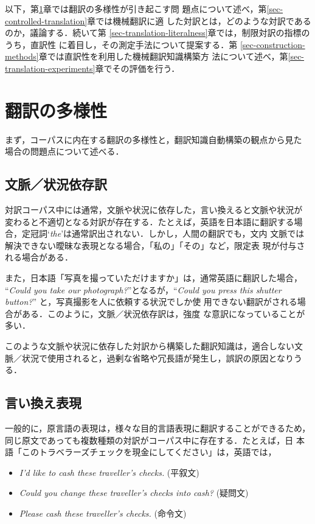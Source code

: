 以下，第\ref{sec-translation-variety}章では翻訳の多様性が引き起こす問
題点について述べ，第\ref{sec-controlled-translation}章では機械翻訳に適
した対訳とは，どのような対訳であるのか，議論する．続いて第
\ref{sec-translation-literalness}章では，制限対訳の指標のうち，直訳性
に着目し，その測定手法について提案する．第
\ref{sec-construction-methods}章では直訳性を利用した機械翻訳知識構築方
法について述べ，第\ref{sec-translation-experiments}章でその評価を行う．

\section{翻訳の多様性}
\label{sec-translation-variety}

まず，コーパスに内在する翻訳の多様性と，翻訳知識自動構築の観点から見た
場合の問題点について述べる．

\subsection{文脈／状況依存訳}

対訳コーパス中には通常，文脈や状況に依存した，言い換えると文脈や状況が
変わると不適切となる対訳が存在する．たとえば，英語を日本語に翻訳する場
合，定冠詞`{\it the}'は通常訳出されない．しかし，人間の翻訳でも，文内
文脈では解決できない曖昧な表現となる場合，「私の」「その」など，限定表
現が付与される場合がある．

また，日本語「写真を撮っていただけますか」は，通常英語に翻訳した場合，
``{\it Could you take our photograph?}''となるが，``{\it Could you
press this shutter button?}''  と，写真撮影を人に依頼する状況でしか使
用できない翻訳がされる場合がある．このように，文脈／状況依存訳は，強度
な意訳になっていることが多い．

このような文脈や状況に依存した対訳から構築した翻訳知識は，適合しない文
脈／状況で使用されると，過剰な省略や冗長語が発生し，誤訳の原因となりうる．

\subsection{言い換え表現}

一般的に，原言語の表現は，様々な目的言語表現に翻訳することができるため，
同じ原文であっても複数種類の対訳がコーパス中に存在する．たとえば，日
本語「このトラベラーズチェックを現金にしてください」は，英語では，

\begin{itemize}
\item {\it I'd like to cash these traveller's checks.} (平叙文)
\item {\it Could you change these traveller's checks into cash?} (疑問文)
\item {\it Please cash these traveller's checks.} (命令文)
\end{itemize}

